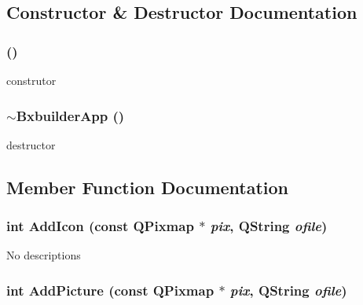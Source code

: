 \subsection{Constructor \& Destructor Documentation}
\hypertarget{class_bxbuilder_app_d965542ad52df92ac3436d51d5779e64}{
\subsubsection[{BxbuilderApp}]{ ()}}
\label{class_bxbuilder_app_d965542ad52df92ac3436d51d5779e64}


construtor \hypertarget{class_bxbuilder_app_70adc92630903b6de478681512c81587}{
\subsubsection[{$\sim$BxbuilderApp}]{\setlength{\rightskip}{0pt plus 5cm}$\sim${\bf BxbuilderApp} ()}}
\label{class_bxbuilder_app_70adc92630903b6de478681512c81587}


destructor 

\subsection{Member Function Documentation}
\hypertarget{class_bxbuilder_app_fb78e67f867e469d371276546899c62f}{
\subsubsection[{AddIcon}]{\setlength{\rightskip}{0pt plus 5cm}int AddIcon (const QPixmap $\ast$ {\em pix}, \/  QString {\em ofile})}}
\label{class_bxbuilder_app_fb78e67f867e469d371276546899c62f}


No descriptions \hypertarget{class_bxbuilder_app_1ee74b295c93cc6a2a07cc1a5a0d1c7b}{
\subsubsection[{AddPicture}]{\setlength{\rightskip}{0pt plus 5cm}int AddPicture (const QPixmap $\ast$ {\em pix}, \/  QString {\em ofile})}}
\label{class_bxbuilder_app_1ee74b295c93cc6a2a07cc1a5a0d1c7b}


